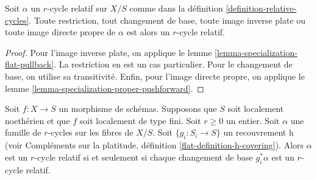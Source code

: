 \begin{lemma} 
\label{lemma-relative-cycle-functoriality} 
Soit  $\alpha$  un  $r$-cycle relatif sur  $X/S$  comme 
dans la définition  \ref{definition-relative-cycles}. Toute 
restriction, tout changement de base, toute image inverse plate ou toute image directe propre
 de $\alpha$ est alors un $r$-cycle relatif. 
\end{lemma} 

\begin{proof} Pour
 l'image inverse plate, on applique le lemme \ref{lemma-specialization-flat-pullback}. 
La restriction en est un cas particulier. Pour le changement de base, 
on utilise sa transitivité. Enfin, pour l'image 
directe propre, on applique le lemme \ref{lemma-specialization-proper-pushforward}. 
\end{proof} 

\begin{lemma} 
\label{lemma-relative-cycles-h-descent} 
Soit  $f : X \to S$  un morphisme de schémas. Supposons que  $S$  soit localement noethérien et
 que  $f$  soit localement de type fini. Soit  $r \geq 0$  un entier. Soit  $\alpha$
  une famille de  $r$-cycles sur les fibres de $X/S$. Soit  $\{g_i : S_i \to S\}$
  un recouvrement h (voir Compléments sur la platitude, définition  
\ref{flat-definition-h-covering}). Alors  $\alpha$  est un  $r$-cycle 
relatif si et seulement si chaque changement de base  $g_i^*\alpha$  est un  $r$-cycle relatif. 
\end{lemma} 

